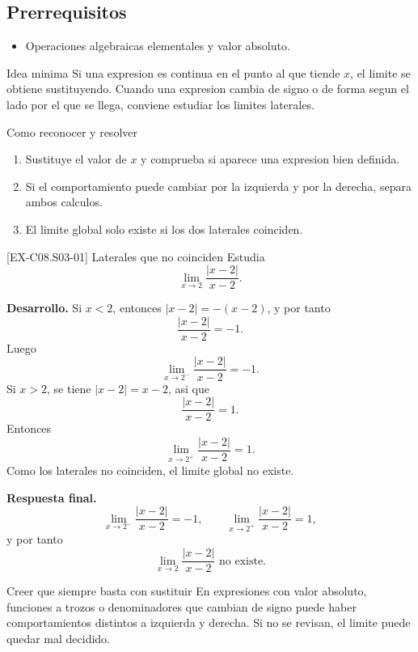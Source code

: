 \subsection*{Prerrequisitos}
\begin{itemize}
  \item Operaciones algebraicas elementales y valor absoluto.
\end{itemize}

\begin{theorybox}{Idea minima}
Si una expresion es continua en el punto al que tiende \(x\), el limite se obtiene
sustituyendo. Cuando una expresion cambia de signo o de forma segun el lado por el que se
llega, conviene estudiar los limites laterales.
\end{theorybox}

\begin{methodbox}{Como reconocer y resolver}
\begin{enumerate}
  \item Sustituye el valor de \(x\) y comprueba si aparece una expresion bien definida.
  \item Si el comportamiento puede cambiar por la izquierda y por la derecha, separa ambos
  calculos.
  \item El limite global solo existe si los dos laterales coinciden.
\end{enumerate}
\end{methodbox}

\begin{solvedexample}{[EX-C08.S03-01] Laterales que no coinciden}
Estudia
\[
\lim_{x\to 2}\frac{|x-2|}{x-2}.
\]

\textbf{Desarrollo.} Si \(x<2\), entonces \(|x-2|=-(x-2)\), y por tanto
\[
\frac{|x-2|}{x-2}=-1.
\]
Luego
\[
\lim_{x\to 2^-}\frac{|x-2|}{x-2}=-1.
\]
Si \(x>2\), se tiene \(|x-2|=x-2\), asi que
\[
\frac{|x-2|}{x-2}=1.
\]
Entonces
\[
\lim_{x\to 2^+}\frac{|x-2|}{x-2}=1.
\]
Como los laterales no coinciden, el limite global no existe.

\textbf{Respuesta final.}
\[
\lim_{x\to 2^-}\frac{|x-2|}{x-2}=-1,\qquad
\lim_{x\to 2^+}\frac{|x-2|}{x-2}=1,
\]
y por tanto
\[
\lim_{x\to 2}\frac{|x-2|}{x-2}\text{ no existe}.
\]
\end{solvedexample}

\begin{commonerror}{Creer que siempre basta con sustituir}
En expresiones con valor absoluto, funciones a trozos o denominadores que cambian de signo
puede haber comportamientos distintos a izquierda y derecha. Si no se revisan, el limite puede
quedar mal decidido.
\end{commonerror}

